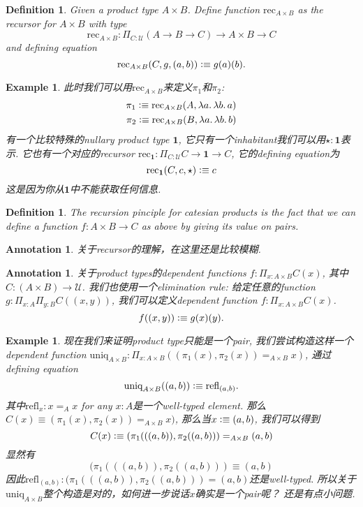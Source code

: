 \documentclass{article}
\newtheorem{example}[theorem]{Example}
\newtheorem{definition}[theorem]{Definition}
\newtheorem{annotation}[theorem]{Annotation}
\newcommand{\lam}[2]{\ensuremath{\lambda #1\ldotp #2}} %
\newcommand{\defeqv}{\vcentcolon\equiv}
\begin{document}
\begin{definition}
\rm Given a product type $A \times B$. Define function $\text{rec}_{A \times B}$ as the recursor for $A \times B$ with type
\[
	\text{rec}_{A \times B}:\Pi_{C:\mathcal{U}}(A \to B \to C) \to A \times B \to C
\]
and defining equation
\[
	\text{rec}_{A \times B}(C, g, (a,b)) \defeqv g(a)(b).
\]
\end{definition}

\begin{example}
\rm 此时我们可以用$\text{rec}_{A \times B}$来定义$\pi_1$和$\pi_2$:
\[
	\begin{aligned}
	\pi_1 \defeqv \text{rec}_{A \times B}(A, \lam{a}{\lam{b}{a}}) \\
	\pi_2 \defeqv \text{rec}_{A \times B}(B, \lam{a}{\lam{b}{b}})
	\end{aligned}
\]
有一个比较特殊的nullary product type $\mathbf{1}$, 它只有一个inhabitant我们可以用$\star:\mathbf{1}$表示. 它也有一个对应的recursor $\text{rec}_\mathbf{1}: \Pi_{C:\mathcal{U}} C \to \mathbf{1} \to C$, 它的defining equation为
\[
	\text{rec}_\mathbf{1}(C, c, \star) \defeqv c 
\]
这是因为你从$\mathbf{1}$中不能获取任何信息.
\end{example}

\begin{definition}
\rm The recursion pinciple for catesian products is the fact that we can define a function $f:A \times B \to C$ as above by giving its value on pairs.
\end{definition}

\begin{annotation}
\rm 关于recursor的理解，在这里还是比较模糊.
\end{annotation}

\begin{annotation}
\rm 关于product types的dependent functions $f: \Pi_{x:A\times B}C(x)$, 其中$C: (A \times B) \to \mathcal{U}$. 我们也使用一个elimination rule: 给定任意的function $g:\Pi_{x:A}\Pi_{y:B}C((x,y))$, 我们可以定义dependent function $f: \Pi_{x:A\times B}C(x)$.
\[
	f((x,y)) \defeqv g(x)(y).
\]
\end{annotation}

\begin{example}
\rm 现在我们来证明product type只能是一个pair, 我们尝试构造这样一个dependent function $\text{uniq}_{A \times B}:\Pi_{x:A \times B}((\pi_1(x),\pi_2(x)) =_{A \times B} x)$, 通过defining equation
\[
	\text{uniq}_{A \times B}((a,b)) \defeqv \text{refl}_{(a,b)}.
\]
其中$\text{refl}_{x}: x =_A x$ for any $x:A$是一个well-typed element. 那么$C(x) \equiv (\pi_1(x),\pi_2(x)) =_{A \times B} x)$, 那么当$x \defeqv (a,b)$, 我们可以得到
\[
	C(x) \defeqv (\pi_1(((a,b)),\pi_2((a,b))) =_{A \times B} (a,b)
\]
显然有
\[
	(\pi_1(((a,b)),\pi_2((a,b))) \equiv (a,b)
\]
因此$\text{refl}_{(a,b)}: (\pi_1(((a,b)),\pi_2((a,b))) = (a,b)$还是well-typed. 所以关于$\text{uniq}_{A \times B}$整个构造是对的，如何进一步说话$x$确实是一个pair呢？ 还是有点小问题.
\end{example}
\end{document}

